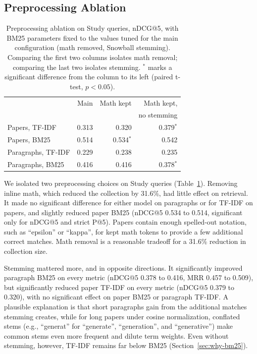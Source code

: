 \documentclass[sigconf,nonacm]{acmart}
\begin{document}
\subsection{Preprocessing Ablation}
\label{sec:ablation}
\begin{table}[t]
  \caption{Preprocessing ablation on Study queries, nDCG@5, with BM25
    parameters fixed to the values tuned for the main configuration
    (math removed, Snowball stemming). Comparing the first two columns
    isolates math removal; comparing the last two isolates stemming.
    $^{*}$ marks a significant difference from the column to its left
    (paired t-test, $p < 0.05$).}
  \label{tab:ablation}
  \small
  \begin{tabular}{lrrr}
    \toprule
    & Main & Math kept & Math kept, \\
    &      &           & no stemming \\
    \midrule
    Papers, TF-IDF     & 0.313 & 0.320 & 0.379$^{*}$ \\
    Papers, BM25       & 0.514 & 0.534$^{*}$ & 0.542 \\
    Paragraphs, TF-IDF & 0.229 & 0.238 & 0.235 \\
    Paragraphs, BM25   & 0.416 & 0.416 & 0.378$^{*}$ \\
    \bottomrule
  \end{tabular}
\end{table}

We isolated two preprocessing choices on Study queries
(Table~\ref{tab:ablation}). Removing inline math, which reduced the
collection by 31.6\%, had little effect on retrieval. It made no
significant difference for either model on paragraphs or for TF-IDF on
papers, and slightly reduced paper BM25 (nDCG@5 0.534 to 0.514,
significant only for nDCG@5 and strict P@5). Papers contain enough
spelled-out notation, such as ``epsilon'' or ``kappa'', for kept math
tokens to provide a few additional correct matches. Math removal is a 
reasonable tradeoff for a 31.6\% reduction in collection size.

Stemming mattered more, and in opposite directions. It significantly improved 
paragraph BM25 on every metric (nDCG@5 0.378 to 0.416, MRR 0.457 to 0.509), but 
significantly reduced paper TF-IDF on every metric (nDCG@5 0.379 to 0.320), with 
no significant effect on paper BM25 or paragraph TF-IDF. A plausible explanation 
is that short paragraphs gain from the additional matches stemming creates, while 
for long papers under cosine normalization, conflated stems (e.g., ``generat'' for 
``generate'', ``generation'', and ``generative'') make common stems even more frequent 
and dilute term weights. Even without stemming, however, TF-IDF remains far below 
BM25 (Section~\ref{sec:why-bm25}).
\end{document}
